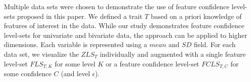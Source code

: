 Multiple data sets were chosen to demonstrate the use of feature confidence level-sets proposed in this paper.
%
We defined a trait $T$ based on a priori knowledge of features of interest in the data.
%
While our study demonstrates feature confidence level-sets for univariate and bivariate data, the approach can be applied to higher dimensions.
%
Each variable is represented using a $mean$ and $SD$ field.
%
For each data set, we visualize the $ZLS_{T}$ individually and augmented with a single feature level-set $FLS_{T,K}$ for some level $K$ or a feature confidence level-set $FCLS_{T,C}$ for some confidence $C$ (and level $\epsilon$).



